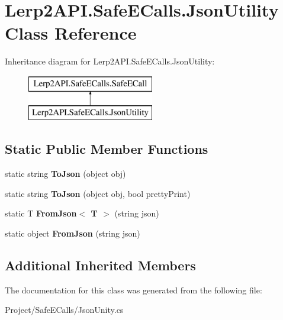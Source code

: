 \hypertarget{class_lerp2_a_p_i_1_1_safe_e_calls_1_1_json_utility}{}\section{Lerp2\+A\+P\+I.\+Safe\+E\+Calls.\+Json\+Utility Class Reference}
\label{class_lerp2_a_p_i_1_1_safe_e_calls_1_1_json_utility}
Inheritance diagram for Lerp2\+A\+P\+I.\+Safe\+E\+Calls.\+Json\+Utility\+:\begin{figure}[H]
\begin{center}
\leavevmode
\includegraphics[height=2.000000cm]{class_lerp2_a_p_i_1_1_safe_e_calls_1_1_json_utility}
\end{center}
\end{figure}
\subsection*{Static Public Member Functions}
\begin{DoxyCompactItemize}
\item 
\mbox{\label{class_lerp2_a_p_i_1_1_safe_e_calls_1_1_json_utility_a9848d9ae46be99c56ced6660bdb8e866}} 
static string {\bfseries To\+Json} (object obj)
\item 
\mbox{\label{class_lerp2_a_p_i_1_1_safe_e_calls_1_1_json_utility_a72a33a009d1a09529f448869f85e6627}} 
static string {\bfseries To\+Json} (object obj, bool pretty\+Print)
\item 
\mbox{\label{class_lerp2_a_p_i_1_1_safe_e_calls_1_1_json_utility_a333244fb4cde796ee95197c46ddef8be}} 
static T {\bfseries From\+Json$<$ T $>$} (string json)
\item 
\mbox{\label{class_lerp2_a_p_i_1_1_safe_e_calls_1_1_json_utility_a9e43c6d45f22ef6046f596254ed1579c}} 
static object {\bfseries From\+Json} (string json)
\end{DoxyCompactItemize}
\subsection*{Additional Inherited Members}


The documentation for this class was generated from the following file\+:\begin{DoxyCompactItemize}
\item 
Project/\+Safe\+E\+Calls/Json\+Unity.\+cs\end{DoxyCompactItemize}

